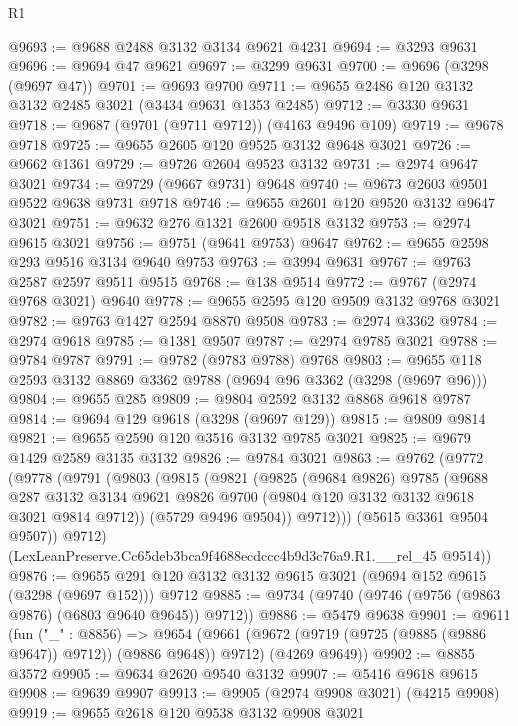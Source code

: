 \begin{lexlean}{R1}
\begin{coremodule}
@9693 := @9688 @2488 @3132 @3134 @9621 @4231
@9694 := @3293 @9631
@9696 := @9694 @47 @9621
@9697 := @3299 @9631
@9700 := @9696 (@3298 (@9697 @47))
@9701 := @9693 @9700
@9711 := @9655 @2486 @120 @3132 @3132 @2485 @3021 (@3434 @9631 @1353 @2485)
@9712 := @3330 @9631
@9718 := @9687 (@9701 (@9711 @9712)) (@4163 @9496 @109)
@9719 := @9678 @9718
@9725 := @9655 @2605 @120 @9525 @3132 @9648 @3021
@9726 := @9662 @1361
@9729 := @9726 @2604 @9523 @3132
@9731 := @2974 @9647 @3021
@9734 := @9729 (@9667 @9731) @9648
@9740 := @9673 @2603 @9501 @9522 @9638 @9731 @9718
@9746 := @9655 @2601 @120 @9520 @3132 @9647 @3021
@9751 := @9632 @276 @1321 @2600 @9518 @3132
@9753 := @2974 @9615 @3021
@9756 := @9751 (@9641 @9753) @9647
@9762 := @9655 @2598 @293 @9516 @3134 @9640 @9753
@9763 := @3994 @9631
@9767 := @9763 @2587 @2597 @9511 @9515
@9768 := @138 @9514
@9772 := @9767 (@2974 @9768 @3021) @9640
@9778 := @9655 @2595 @120 @9509 @3132 @9768 @3021
@9782 := @9763 @1427 @2594 @8870 @9508
@9783 := @2974 @3362
@9784 := @2974 @9618
@9785 := @1381 @9507
@9787 := @2974 @9785 @3021
@9788 := @9784 @9787
@9791 := @9782 (@9783 @9788) @9768
@9803 := @9655 @118 @2593 @3132 @8869 @3362 @9788 (@9694 @96 @3362 (@3298 (@9697 @96)))
@9804 := @9655 @285
@9809 := @9804 @2592 @3132 @8868 @9618 @9787
@9814 := @9694 @129 @9618 (@3298 (@9697 @129))
@9815 := @9809 @9814
@9821 := @9655 @2590 @120 @3516 @3132 @9785 @3021
@9825 := @9679 @1429 @2589 @3135 @3132
@9826 := @9784 @3021
@9863 := @9762
    (@9772
      (@9778
        (@9791
          (@9803
            (@9815
              (@9821
                (@9825
                  (@9684 @9826)
                  @9785
                  (@9688
                    @287
                    @3132
                    @3134
                    @9621
                    @9826
                    @9700
                    (@9804 @120 @3132 @3132 @9618 @3021 @9814 @9712))
                  (@5729 @9496 @9504))
                @9712)))
          (@5615 @3361 @9504 @9507))
        @9712)
      (LexLeanPreserve.Cc65deb3bca9f4688ecdccc4b9d3c76a9.R1.__rel_45 @9514))
@9876 := @9655 @291 @120 @3132 @3132 @9615 @3021 (@9694 @152 @9615 (@3298 (@9697 @152))) @9712
@9885 := @9734 (@9740 (@9746 (@9756 (@9863 @9876) (@6803 @9640 @9645)) @9712))
@9886 := @5479 @9638
@9901 := @9611
    (fun ("_" : @8856) =>
    @9654
      (@9661 (@9672 (@9719 (@9725 (@9885 (@9886 @9647)) @9712)) (@9886 @9648)) @9712)
      (@4269 @9649))
@9902 := @8855 @3572
@9905 := @9634 @2620 @9540 @3132
@9907 := @5416 @9618 @9615
@9908 := @9639 @9907
@9913 := @9905 (@2974 @9908 @3021) (@4215 @9908)
@9919 := @9655 @2618 @120 @9538 @3132 @9908 @3021

\end{coremodule}
\end{lexlean}
